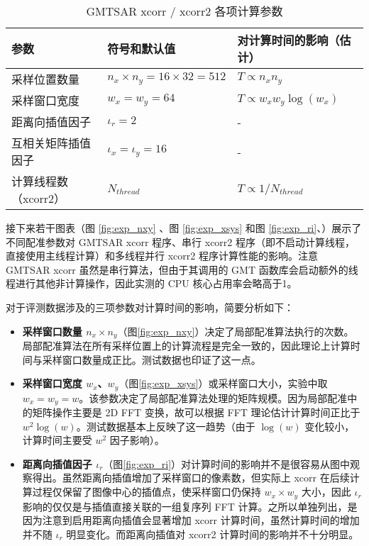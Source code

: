 \begin{table}[htbp]
\centering
\begin{tabular}{|l|l|l|}
    \hline
    \textbf{参数} & \textbf{符号和默认值} & \textbf{对计算时间的影响（估计）} \\
    \hline
    采样位置数量         & $ n_x \times n_y = 16 \times 32 = 512 $  & $ T \propto n_x n_y $                          \\
    \hline
    采样窗口宽度         & $ w_x = w_y = 64 $                       & $ T \propto w_x w_y \log(w_x) $                \\ 
    \hline
    距离向插值因子       & $ \iota_r = 2 $                          & -                                              \\
    \hline
    互相关矩阵插值因子   & $ \iota_x = \iota_y = 16 $               & -                                              \\ 
    \hline
    计算线程数（xcorr2） & $ N_{thread} $                           & $ T \propto 1 / N_{thread} $                   \\ 
    \hline
\end{tabular}
\caption{GMTSAR xcorr / xcorr2 各项计算参数} \label{tab:xcorr-args}
\end{table}
 
接下来若干图表（图 \ref{fig:exp_nxy} 、图 \ref{fig:exp_xsys} 和图 \ref{fig:exp_ri}、）展示了不同配准参数对 GMTSAR xcorr 程序、串行 xcorr2 程序（即不启动计算线程，直接使用主线程计算）和多线程并行 xcorr2 程序计算性能的影响。注意 GMTSAR xcorr 虽然是串行算法，但由于其调用的 GMT 函数库会启动额外的线程进行其他非计算操作，因此实测的 CPU 核心占用率会略高于1。

对于评测数据涉及的三项参数对计算时间的影响，简要分析如下：

\begin{itemize}
    \item \textbf{采样窗口数量 $n_x \times n_y$}（图\ref{fig:exp_nxy}）决定了局部配准算法执行的次数。局部配准算法在所有采样位置上的计算流程是完全一致的，因此理论上计算时间与采样窗口数量成正比。测试数据也印证了这一点。
    \item \textbf{采样窗口宽度 $w_x$、$w_y$}（图\ref{fig:exp_xsys}）或采样窗口大小，实验中取 $w_x = w_y = w$。该参数决定了局部配准算法处理的矩阵规模。因为局部配准中的矩阵操作主要是 2D FFT 变换，故可以根据 FFT 理论估计计算时间正比于 $w^2 \log(w)$。测试数据基本上反映了这一趋势（由于 $\log(w)$ 变化较小，计算时间主要受 $w^2$ 因子影响）。
    \item \textbf{距离向插值因子 $\iota_r$}（图\ref{fig:exp_ri}）对计算时间的影响并不是很容易从图中观察得出。虽然距离向插值增加了采样窗口的像素数，但实际上 xcorr 在后续计算过程仅保留了图像中心的插值点，使采样窗口仍保持 $w_x \times w_y$ 大小，因此 $\iota_r$ 影响的仅仅是与插值直接关联的一组复序列 FFT 计算。之所以单独列出，是因为注意到启用距离向插值会显著增加 xcorr 计算时间，虽然计算时间的增加并不随 $\iota_r$ 明显变化。而距离向插值对 xcorr2 计算时间的影响并不十分明显。
\end{itemize}

